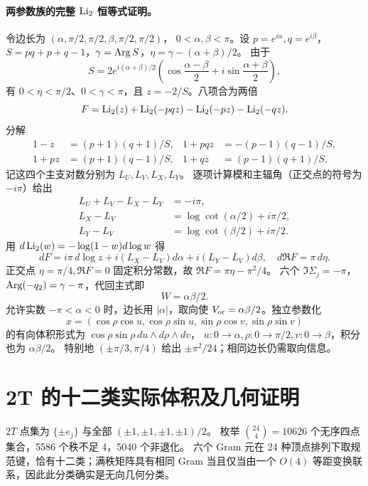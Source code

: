 \paragraph{两参数族的完整 $\operatorname{Li}_2$ 恒等式证明。}
令边长为 $(\alpha,\pi/2,\pi/2,\beta,\pi/2,\pi/2)$，
$0<\alpha,\beta<\pi$。设 $p=e^{i\alpha},q=e^{i\beta}$，
$S=pq+p+q-1$，$\gamma=\operatorname{Arg} S$，$\eta=\gamma-(\alpha+\beta)/2$。
由于
\[
 S=2e^{i(\alpha+\beta)/2}
 \left(\cos\frac{\alpha-\beta}{2}+i\sin\frac{\alpha+\beta}{2}\right),
\]
有 $0<\eta<\pi/2$、$0<\gamma<\pi$，且 $z=-2/S$。八项合为两倍
\[
F=\operatorname{Li}_2(z)+\operatorname{Li}_2(-pqz)-\operatorname{Li}_2(-pz)-\operatorname{Li}_2(-qz).
\]
分解
\begin{align}
1-z&=(p+1)(q+1)/S,&1+pqz&=-(p-1)(q-1)/S,\\
1+pz&=(p+1)(q-1)/S,&1+qz&=(p-1)(q+1)/S.
\end{align}
记这四个主支对数分别为 $L_U,L_V,L_X,L_Y$。
逐项计算模和主辐角（正交点的符号为 $-i\pi$）给出
\begin{align}
 L_U+L_V-L_X-L_Y&=-i\pi,\\
 L_X-L_V&=\log\cot(\alpha/2)+i\pi/2,\\
 L_Y-L_V&=\log\cot(\beta/2)+i\pi/2.
\end{align}
用 $d\operatorname{Li}_2(w)=-\log(1-w)d\log w$ 得
\[
dF=i\pi\,d\log z+i(L_X-L_V)d\alpha+i(L_Y-L_V)d\beta,
\quad d\Re F=\pi\,d\eta.
\]
正交点 $\eta=\pi/4,\Re F=0$ 固定积分常数，故
$\Re F=\pi\eta-\pi^2/4$。
六个 $\Im\Sigma_j=-\pi$，$\operatorname{Arg}(-q_2)=\gamma-\pi$，代回主式即
\[
 W=\alpha\beta/2.
\]
允许实数 $-\pi<\alpha<0$ 时，边长用 $|\alpha|$，取向使
$V_{\rm or}=\alpha\beta/2$。独立参数化
\[
x=(\cos\rho\cos u,\cos\rho\sin u,\sin\rho\cos v,\sin\rho\sin v)
\]
的有向体积形式为 $\cos\rho\sin\rho\,du\wedge d\rho\wedge dv$，
$u:0\to\alpha,\rho:0\to\pi/2,v:0\to\beta$，积分也为 $\alpha\beta/2$。
特别地 $(\pm\pi/3,\pi/4)$ 给出 $\pm\pi^2/24$；相同边长仍需取向信息。

\section{2T 的十二类实际体积及几何证明}
\label{sec:2t-actual}

$2T$ 点集为 $\{\pm e_j\}$ 与全部 $(\pm1,\pm1,\pm1,\pm1)/2$。
枚举 $\binom{24}{4}=10626$ 个无序四点集合，5586 个秩不足 4，5040 个非退化。
六个 Gram 元在 24 种顶点排列下取规范键，恰有十二类；满秩矩阵具有相同 Gram
当且仅当由一个 $O(4)$ 等距变换联系，因此此分类确实是无向几何分类。

